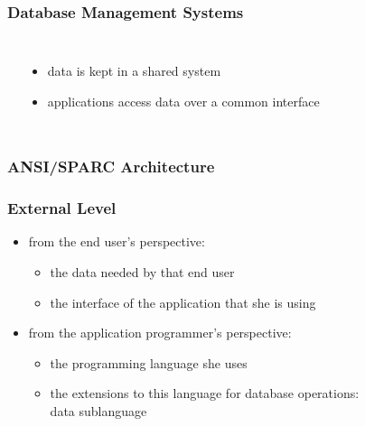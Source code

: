 \documentclass[dvipsnames]{beamer}
\theoremstyle{plain}
\begin{document}
\begin{frame}
  \frametitle{Database Management Systems}

  \begin{columns}
    \begin{center}
    \end{center}

    \begin{itemize}
      \item data is kept in a shared system
      \item applications access data over a common interface
    \end{itemize}
  \end{columns}
\end{frame}

\begin{frame}
  \frametitle{ANSI/SPARC Architecture}

  \begin{center}
  \end{center}
\end{frame}

\begin{frame}
  \frametitle{External Level}

  \begin{itemize}
    \item from the end user's perspective:
    \begin{itemize}
      \item the data needed by that end user
      \item the interface of the application that she is using
    \end{itemize}

    \pause
    \bigskip
    \item from the application programmer's perspective:
    \begin{itemize}
      \item the programming language she uses
      \item the extensions to this language for database operations:\\
        \alert{data sublanguage}
    \end{itemize}
  \end{itemize}
\end{frame}
\end{document}
